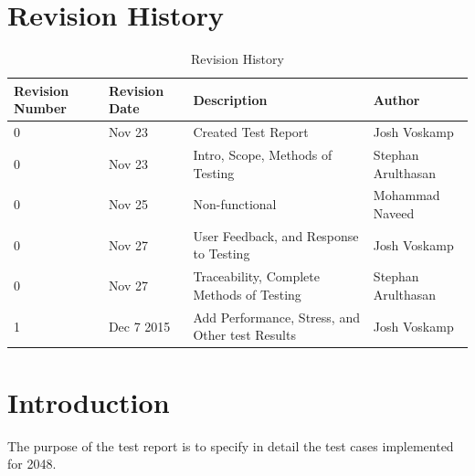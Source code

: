 \documentclass[12pt]{article}
\begin{document}
\begin{titlepage}



\vfill %

\end{titlepage}

\newpage
\tableofcontents
\newpage
\listoftables
{}
\newpage
\listoffigures
{}
\newpage

\section*{Revision History}
\begin{table}[H]
	\centering
    \begin{tabular}{ | p{2cm} |  p{2cm} | p{5cm} | p{3.8cm} |}
    \hline
    Revision Number & Revision Date & Description & Author \\ \hline
    0 & Nov 23 & Created Test Report & Josh Voskamp \\ \hline
	0 & Nov 23 & Intro, Scope, Methods of Testing & Stephan Arulthasan\\ \hline
	0 & Nov 25 & Non-functional & Mohammad Naveed \\ \hline
	0 & Nov 27 & User Feedback, and Response to Testing & Josh Voskamp \\ \hline
	0 & Nov 27 & Traceability, Complete Methods of Testing & Stephan Arulthasan \\\hline
	\color{red} 1 &\color{red} Dec 7 2015 &\color{red} Add Performance, Stress, and Other test Results &\color{red} Josh Voskamp \\\hline
    \end{tabular}
    \caption{Revision History}
\end{table}

\newpage

\section{Introduction}
The purpose of the test report is to specify in detail the test cases implemented for 2048.
\end{document}
